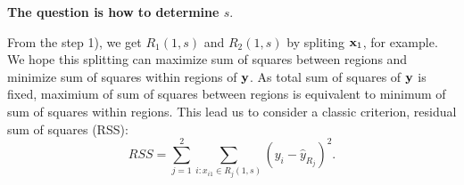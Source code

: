 \documentclass[]{book}
\begin{document}
\textbf{The question is how to determine \(s\)}.

From the step 1), we get \(R_1(1,s)\) and \(R_2(1,s)\) by spliting \({\bf x}_1\), for example. We hope this splitting can maximize sum of squares between regions and minimize sum of squares within regions of \({\bf y}\). As total sum of squares of \({\bf y}\) is fixed, maximium of sum of squares between regions is equivalent to minimum of sum of squares within regions. This lead us to consider a classic criterion, residual sum of squares (RSS):
\[
RSS = \sum_{j=1}^{2}\sum_{i:x_{i1}\in R_j(1,s)}(y_i - \hat y_{R_j})^2.
\]


\end{document}
